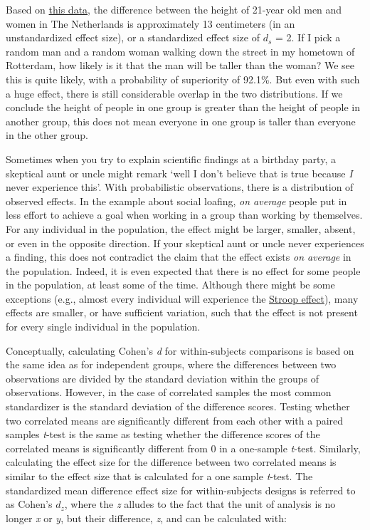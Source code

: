 \documentclass[
  oneside]{krantz}
\begin{document}
Based on \href{http://www.nature.com/pr/journal/v73/n3/full/pr2012189a.html}{this data}, the difference between the height of 21-year old men and women in The Netherlands is approximately 13 centimeters (in an unstandardized effect size), or a standardized effect size of \(d_s\) = 2. If I pick a random man and a random woman walking down the street in my hometown of Rotterdam, how likely is it that the man will be taller than the woman? We see this is quite likely, with a probability of superiority of 92.1\%. But even with such a huge effect, there is still considerable overlap in the two distributions. If we conclude the height of people in one group is greater than the height of people in another group, this does not mean everyone in one group is taller than everyone in the other group.

Sometimes when you try to explain scientific findings at a birthday party, a skeptical aunt or uncle might remark `well I don't believe that is true because \emph{I} never experience this'. With probabilistic observations, there is a distribution of observed effects. In the example about social loafing, \emph{on average} people put in less effort to achieve a goal when working in a group than working by themselves. For any individual in the population, the effect might be larger, smaller, absent, or even in the opposite direction. If your skeptical aunt or uncle never experiences a finding, this does not contradict the claim that the effect exists \emph{on average} in the population. Indeed, it is even expected that there is no effect for some people in the population, at least some of the time. Although there might be some exceptions (e.g., almost every individual will experience the \href{https://en.wikipedia.org/wiki/Stroop_effect}{Stroop effect}), many effects are smaller, or have sufficient variation, such that the effect is not present for every single individual in the population.

Conceptually, calculating Cohen's \emph{d} for within-subjects comparisons is based on the same idea as for independent groups, where the differences between two observations are divided by the standard deviation within the groups of observations. However, in the case of correlated samples the most common standardizer is the standard deviation of the difference scores. Testing whether two correlated means are significantly different from each other with a paired samples \emph{t}-test is the same as testing whether the difference scores of the correlated means is significantly different from 0 in a one-sample \emph{t}-test. Similarly, calculating the effect size for the difference between two correlated means is similar to the effect size that is calculated for a one sample \emph{t}-test. The standardized mean difference effect size for within-subjects designs is referred to as Cohen's \(d_z\), where the \emph{z} alludes to the fact that the unit of analysis is no longer \emph{x} or \emph{y}, but their difference, \emph{z}, and can be calculated with:
\end{document}
